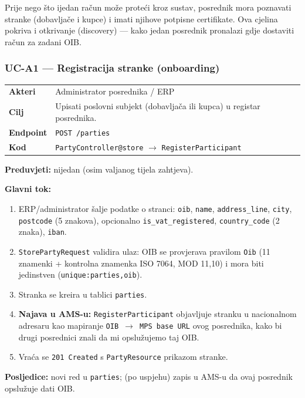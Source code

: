 \documentclass[11pt,a4paper]{article}
\begin{document}
Prije nego što ijedan račun može proteći kroz sustav, posrednik mora poznavati
stranke (dobavljače i kupce) i imati njihove potpisne certifikate. Ova cjelina
pokriva i otkrivanje (discovery) — kako jedan posrednik pronalazi gdje dostaviti
račun za zadani OIB.

\subsubsection{UC-A1 — Registracija stranke (onboarding)}

\begin{tabularx}{\textwidth}{@{}lY@{}}
\toprule
\textbf{Akteri} & Administrator posrednika / ERP \\
\textbf{Cilj} & Upisati poslovni subjekt (dobavljača ili kupca) u registar posrednika. \\
\textbf{Endpoint} & \texttt{POST /parties} \\
\textbf{Kod} & \texttt{PartyController@store} $\rightarrow$ \texttt{RegisterParticipant} \\
\bottomrule
\end{tabularx}

\textbf{Preduvjeti:} nijedan (osim valjanog tijela zahtjeva).

\textbf{Glavni tok:}
\begin{enumerate}[nosep]
  \item ERP/administrator šalje podatke o stranci: \texttt{oib}, \texttt{name}, \texttt{address\_line}, \texttt{city},
        \texttt{postcode} (5 znakova), opcionalno \texttt{is\_vat\_registered}, \texttt{country\_code} (2 znaka), \texttt{iban}.
  \item \texttt{StorePartyRequest} validira ulaz: OIB se provjerava pravilom \texttt{Oib} (11 znamenki +
        kontrolna znamenka ISO 7064, MOD 11,10) i mora biti jedinstven (\texttt{unique:parties,oib}).
  \item Stranka se kreira u tablici \texttt{parties}.
  \item \textbf{Najava u AMS-u:} \texttt{RegisterParticipant} objavljuje stranku u nacionalnom adresaru kao
        mapiranje \texttt{OIB $\rightarrow$ MPS base URL} ovog posrednika, kako bi drugi posrednici znali da mi
        opslužujemo taj OIB.
  \item Vraća se \texttt{201 Created} s \texttt{PartyResource} prikazom stranke.
\end{enumerate}

\textbf{Posljedice:} novi red u \texttt{parties}; (po uspjehu) zapis u AMS-u da ovaj posrednik
opslužuje dati OIB.
\end{document}
